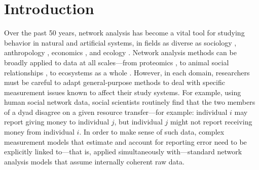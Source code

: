 \documentclass[Afour,sageh,times]{sagej}
\begin{document}

\maketitle
\section{Introduction}
\linenumbers

Over the past 50 years, network analysis has become a vital tool for studying behavior in natural and artificial systems, in fields as diverse as sociology \citep{carrington2005models, scott2002social, snijders2011statistical}, anthropology \citep{jang2024women, power2017social, von2019dynamics}, economics \citep{jackson2010social, ter2009applying}, and ecology \citep{pinter2014dynamics, sosa2021animal}. Network analysis methods can be broadly applied to data at all scales---from proteomics \citep{ravasz2002hierarchical}, to animal social relationships \citep{croft2008exploring}, to ecosystems as a whole \citep{ulanowicz2014limits}. However, in each domain, researchers must be careful to adapt general-purpose methods to deal with specific measurement issues known to affect their study systems. For example, using human social network data, social scientists routinely find that the two members of a dyad disagree on a given resource transfer---for example: individual $i$ may report giving money to individual $j$, but individual $j$ might not report receiving money from individual $i$. In order to make sense of such data, complex measurement models \citep[e.g.,][]{butts2003network, young2020bayesian, redhead2023reliable, de2023latent} that estimate and account for reporting error need to be explicitly linked to---that is, applied simultaneously with---standard network analysis models \citep{kenny1984social, back2010social, karrer2011stochastic} that assume internally coherent raw data.
\end{document}
